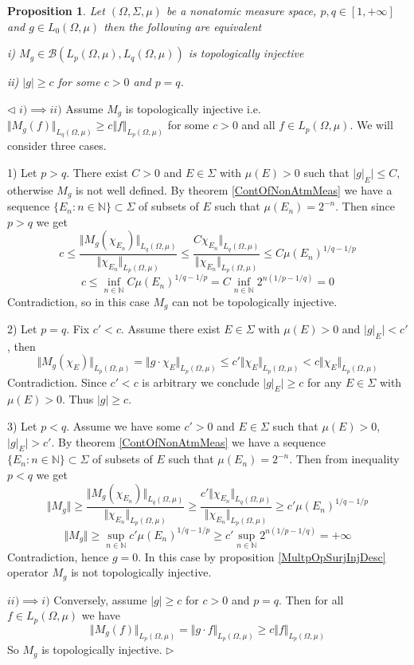 \documentclass[12pt]{article}
\newtheorem{proposition}[theorem]{Proposition}
\newenvironment{proof}{\par $\triangleleft$}{$\triangleright$}
\begin{document}
\begin{proposition}\label{TopInjMultOpCharacOnNonAtomMeasSp} Let $(\Omega,\Sigma,\mu)$ be a nonatomic measure space, $p,q\in[1,+\infty]$ and $g\in L_0(\Omega,\mu)$ then the following are equivalent

i) $M_g\in\mathcal{B}(L_p(\Omega,\mu),L_q(\Omega,\mu))$ is topologically injective

ii) $|g|\geq c$ for some $c>0$ and $p=q$.
\end{proposition}
\begin{proof}
$i)\implies ii)$ Assume $M_g$ is topologically injective i.e. $\Vert M_g(f)\Vert_{L_q(\Omega,\mu)}\geq c\Vert f\Vert_{L_p(\Omega,\mu)}$ for some $c>0$ and all $f\in L_p(\Omega,\mu)$. We will consider three cases.

1)  Let $p>q$. There exist $C>0$ and $E\in\Sigma$ with $\mu(E)>0$ such that $|g|_E|\leq C$, otherwise $M_g$ is not well defined. By theorem \ref{ContOfNonAtmMeas} we have a sequence $\{E_n:n\in\mathbb{N}\}\subset\Sigma$ of subsets of $E$ such that $\mu(E_n)=2^{-n}$. Then since $p>q$ we get
$$
c
\leq\frac{\Vert M_g(\chi_{E_n})\Vert_{L_q(\Omega,\mu)}}{\Vert \chi_{E_n}\Vert_{L_p(\Omega,\mu)}}
\leq\frac{C\chi_{E_n}\Vert_{L_q(\Omega,\mu)}}{\Vert \chi_{E_n}\Vert_{L_p(\Omega,\mu)}}
\leq C\mu(E_n)^{1/q-1/p}
$$
$$
c
\leq\inf_{n\in\mathbb{N}}C\mu(E_n)^{1/q-1/p}
=C\inf_{n\in\mathbb{N}} 2^{n(1/p-1/q)}=0
$$
Contradiction, so in this case $M_g$ can not be topologically injective.

2) Let $p=q$. Fix $c'<c$. Assume there exist $E\in\Sigma$ with $\mu(E)>0$ and $|g|_{E}|<c'$, then
$$
\Vert M_g(\chi_{E})\Vert_{L_p(\Omega,\mu)}
=\Vert g \cdot\chi_{E}\Vert_{L_p(\Omega,\mu)}
\leq c' \Vert \chi_{E}\Vert_{L_p(\Omega,\mu)}
<c\Vert \chi_{E}\Vert_{L_p(\Omega,\mu)}
$$
Contradiction. Since $c'<c$ is arbitrary we conclude $|g|_E|\geq c$ for any $E\in\Sigma$ with $\mu(E)>0$. Thus $|g|\geq c$.

3) Let $p<q$. Assume we have some $c'>0$ and $E\in\Sigma$ such that $\mu(E)>0$, $|g|_E|>c'$. By theorem \ref{ContOfNonAtmMeas} we have a sequence  $\{E_n:n\in\mathbb{N}\}\subset\Sigma$ of subsets of $E$ such that $\mu(E_n)=2^{-n}$. Then from inequality $p<q$ we get
$$
\Vert M_g\Vert
\geq\frac{\Vert M_g(\chi_{E_n})\Vert_{L_q(\Omega,\mu)}}{\Vert \chi_{E_n}\Vert_{L_p(\Omega,\mu)}}
\geq\frac{c'\Vert\chi_{E_n}\Vert_{L_q(\Omega,\mu)}}{\Vert \chi_{E_n}\Vert_{L_p(\Omega,\mu)}}
\geq c'\mu(E_n)^{1/q-1/p}
$$
$$
\Vert M_g\Vert
\geq\sup_{n\in\mathbb{N}}c'\mu(E_n)^{1/q-1/p}
\geq c'\sup_{n\in\mathbb{N}}2^{n(1/p-1/q)}
=+\infty
$$
Contradiction, hence $g=0$. In this case by proposition \ref{MultpOpSurjInjDesc} operator $M_g$ is not topologically injective.

$ii)\implies i)$ Conversely, assume $|g|\geq c$ for $c>0$ and $p=q$. Then for all $f\in L_p(\Omega,\mu)$ we have
$$
\Vert M_g(f)\Vert_{L_p(\Omega,\mu)}
=\Vert g\cdot f\Vert_{L_p(\Omega,\mu)}
\geq c\Vert f\Vert_{L_p(\Omega,\mu)}
$$
So $M_g$ is topologically injective.
\end{proof}
\end{document}
